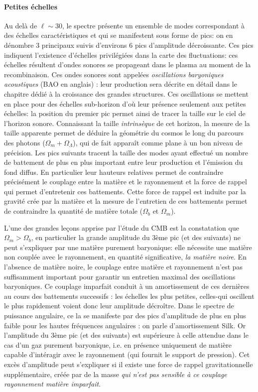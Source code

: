 \paragraph{Petites échelles} Au delà de $\ell\sim 30$, le spectre présente un ensemble de modes correspondant à des échelles caractéristiques et qui se manifestent sous forme de pics: on en dénombre 3 principaux suivis d'environs 6 pics d'amplitude décroissante. Ces pics indiquent l'existence d'échelles privilégiées dans la carte des fluctuations: ces échelles résultent d'ondes sonores se propageant dans le plasma au moment de la recombinaison. Ces ondes sonores sont appelées \textit{oscillations baryoniques acoustiques} (BAO en anglais) : leur production sera décrite en détail dans le chapitre dédié à la croissance des grandes structures. Ces oscillations se mettent en place pour des échelles sub-horizon d'où leur présence seulement aux petites échelles: la position du premier pic permet ainsi de tracer la taille sur le ciel de l'horizon sonore. Connaissant la taille \textit{intrinsèque} de cet horizon, la mesure de la taille apparente permet de déduire la géométrie du cosmos le long du parcours des photons ($\Omega_m+\Omega_\Lambda$), qui de fait apparaît comme plane à un bon niveau de précision. Les pics suivants tracent la taille des modes ayant effectué un nombre de battement de plus en plus important entre leur production et l'émission du fond diffus. En particulier leur hauteurs relatives permet de contraindre précisément le couplage entre la matière et le rayonnement et la force de rappel qui permet d'entretenir ces battements. Cette force de rappel est induite par la gravité crée par la matière et la mesure de l'entretien de ces battements permet de contraindre la quantité de matière totale ($\Omega_b$ et $\Omega_m$). 

L'une des grandes leçons apprise par l'étude du CMB est la constatation que $\Omega_m>\Omega_b$, en particulier la grande amplitude du 3ème pic (et des suivants) ne peut s'expliquer par une matière purement baryonique: elle nécessite une matière non couplée avec le rayonnement, en quantité significative, \textit{la matière noire}. En l'absence de matière noire, le couplage entre matière et rayonnement n'est pas suffisamment important pour garantir un entretien maximal des oscillations baryoniques. Ce couplage imparfait conduit à un amortissement de ces dernières au cours des battements successifs : les échelles les plus petites, celles-qui oscillent le plus rapidement voient donc leur amplitude décroître. Dans le spectre de puissance angulaire, ce la se manifeste par des pics d'amplitude de plus en plus faible pour les hautes fréquences angulaires : on parle d'amortissement Silk. Or l'amplitude du 3ème pic (et des suivants) est supérieure à celle attendue dans le cas d'un gaz purement baryonique, i.e. en présence uniquement de matière capable d'intéragir avec le rayonnement (qui fournit le support de pression). Cet excès d'amplitude peut s'expliquer si il existe une force de rappel gravitationnelle supplémentaire, créée par de la masse \textit{qui n'est pas sensible à ce couplage rayonnement matière imparfait}. 

